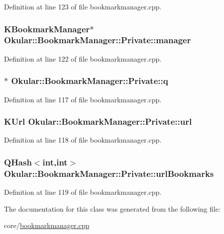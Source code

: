 Definition at line 123 of file bookmarkmanager.\+cpp.

\hypertarget{classBookmarkManager_1_1Private_a18a0825534de4ad364d428c740e3692f}{
\subsubsection[{manager}]{\setlength{\rightskip}{0pt plus 5cm}K\+Bookmark\+Manager$\ast$ Okular\+::\+Bookmark\+Manager\+::\+Private\+::manager}}\label{classBookmarkManager_1_1Private_a18a0825534de4ad364d428c740e3692f}


Definition at line 122 of file bookmarkmanager.\+cpp.

\hypertarget{classBookmarkManager_1_1Private_af306f5f96c025b5b5131bdd769575cb7}{
\subsubsection[{q}]{$\ast$ Okular\+::\+Bookmark\+Manager\+::\+Private\+::q}}\label{classBookmarkManager_1_1Private_af306f5f96c025b5b5131bdd769575cb7}


Definition at line 117 of file bookmarkmanager.\+cpp.

\hypertarget{classBookmarkManager_1_1Private_a76891cf0a4b6713612876ee2eceee94d}{
\subsubsection[{url}]{\setlength{\rightskip}{0pt plus 5cm}K\+Url Okular\+::\+Bookmark\+Manager\+::\+Private\+::url}}\label{classBookmarkManager_1_1Private_a76891cf0a4b6713612876ee2eceee94d}


Definition at line 118 of file bookmarkmanager.\+cpp.

\hypertarget{classBookmarkManager_1_1Private_a1c8a7ef1c0aa4ec956125cedf1cc9c04}{
\subsubsection[{url\+Bookmarks}]{\setlength{\rightskip}{0pt plus 5cm}Q\+Hash$<$int,int$>$ Okular\+::\+Bookmark\+Manager\+::\+Private\+::url\+Bookmarks}}\label{classBookmarkManager_1_1Private_a1c8a7ef1c0aa4ec956125cedf1cc9c04}


Definition at line 119 of file bookmarkmanager.\+cpp.



The documentation for this class was generated from the following file\+:\begin{DoxyCompactItemize}
\item 
core/\hyperlink{bookmarkmanager_8cpp}{bookmarkmanager.\+cpp}\end{DoxyCompactItemize}
